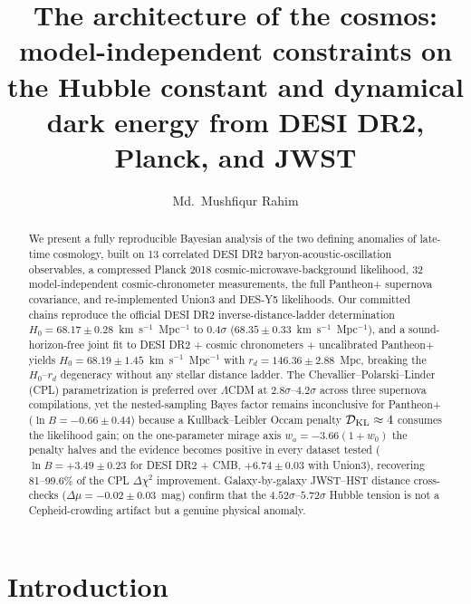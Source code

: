 \documentclass[aps,prd,twocolumn,superscriptaddress,nofootinbib]{revtex4-2}
\begin{document}
\title{The architecture of the cosmos: model-independent constraints on the Hubble constant and dynamical dark energy from DESI DR2, Planck, and JWST}

\author{Md.~Mushfiqur Rahim}

\begin{abstract}
We present a fully reproducible Bayesian analysis of the two defining anomalies of late-time cosmology, built on 13 correlated DESI DR2 baryon-acoustic-oscillation observables, a compressed Planck 2018 cosmic-microwave-background likelihood, 32 model-independent cosmic-chronometer measurements, the full Pantheon+ supernova covariance, and re-implemented Union3 and DES-Y5 likelihoods. Our committed chains reproduce the official DESI DR2 inverse-distance-ladder determination $H_0 = 68.17 \pm 0.28$~km~s$^{-1}$~Mpc$^{-1}$ to $0.4\sigma$ ($68.35 \pm 0.33$~km~s$^{-1}$~Mpc$^{-1}$), and a sound-horizon-free joint fit to DESI DR2 + cosmic chronometers + uncalibrated Pantheon+ yields $H_0 = 68.19 \pm 1.45$~km~s$^{-1}$~Mpc$^{-1}$ with $r_d = 146.36 \pm 2.88$~Mpc, breaking the $H_0$--$r_d$ degeneracy without any stellar distance ladder. The Chevallier--Polarski--Linder (CPL) parametrization is preferred over $\Lambda$CDM at $2.8\sigma$--$4.2\sigma$ across three supernova compilations, yet the nested-sampling Bayes factor remains inconclusive for Pantheon+ ($\ln B = -0.66 \pm 0.44$) because a Kullback--Leibler Occam penalty $\mathcal{D}_{\rm KL} \approx 4$ consumes the likelihood gain; on the one-parameter mirage axis $w_a = -3.66(1+w_0)$ the penalty halves and the evidence becomes positive in every dataset tested ($\ln B = +3.49 \pm 0.23$ for DESI DR2 + CMB, $+6.74 \pm 0.03$ with Union3), recovering 81--99.6\% of the CPL $\Delta\chi^2$ improvement. Galaxy-by-galaxy JWST--HST distance cross-checks ($\Delta\mu = -0.02 \pm 0.03$~mag) confirm that the $4.52\sigma$--$5.72\sigma$ Hubble tension is not a Cepheid-crowding artifact but a genuine physical anomaly.
\end{abstract}

\maketitle

\section{Introduction}
\label{sec:intro}
\end{document}
